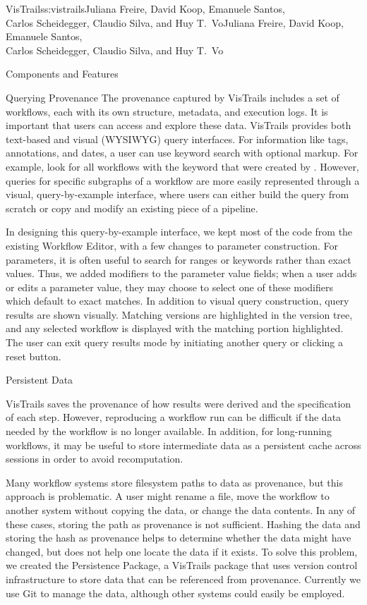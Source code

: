 \begin{aosachaptertoc}{VisTrails}{s:vistrails}{Juliana Freire, David Koop, Emanuele Santos, \\ Carlos Scheidegger, Claudio Silva, and Huy T.\ Vo}{Juliana Freire, David Koop, Emanuele Santos, \\ \hspace*{0.9cm} Carlos Scheidegger, Claudio Silva, and Huy T.\ Vo}
\begin{aosasect1}{Components and Features}
\begin{aosasect2}{Querying Provenance}
The provenance captured by VisTrails includes a set of workflows, each
with its own structure, 
metadata, and execution logs. It is important that users can access
and explore these data.  VisTrails provides both text-based and visual
(WYSIWYG) query interfaces.  For information like tags, annotations,
and dates, a user can use keyword search with optional markup. For
example, look for all workflows with the keyword  that were
created by .  However, queries for specific subgraphs of
a workflow are more easily represented through a visual, query-by-example interface, where users can
either build the query from scratch or copy and modify an existing
piece of a pipeline.

In designing this query-by-example interface, we kept most of the code
from the existing Workflow Editor, with a few changes to parameter
construction.  For parameters, it is often useful to search for ranges
or keywords rather than exact values.  Thus, we added modifiers to the
parameter value fields; when a user adds or edits a parameter value,
they may choose to select one of these modifiers which default to
exact matches.  In addition to visual query construction, query
results are shown visually.  Matching versions are highlighted in the
version tree, and any selected workflow is displayed with the matching
portion highlighted.  The user can exit query results mode by
initiating another query or clicking a reset button.

\end{aosasect2}

\begin{aosasect2}{Persistent Data}

VisTrails saves the provenance of how results were derived and the
specification of each step. However, reproducing a workflow run can be
difficult if the data needed by the workflow is no longer available.
In addition, for long-running workflows, it may be useful to store
intermediate data as a persistent cache across sessions in order to
avoid recomputation.

Many workflow systems store filesystem paths to data as provenance,
but this approach is problematic.  A user might rename a file, move
the workflow to another system without copying the data, or change the
data contents.  In any of these cases, storing the path as provenance
is not sufficient.  Hashing the data and storing
the hash as provenance helps to determine whether the data might have
changed, but does not help one locate the data if it exists.  To solve
this problem, we created the Persistence Package, a VisTrails package
that uses version control infrastructure to store data that can be
referenced from provenance.  Currently we use Git to manage the data,
although other systems could easily be employed.


\end{aosasect2}
\end{aosasect1}
\end{aosachaptertoc}
